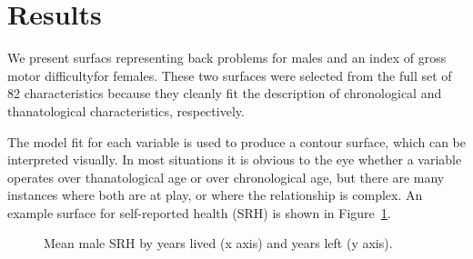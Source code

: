 \documentclass{article}
\begin{document}



\section*{Results}

We present surfacs representing back problems for males and
an index of gross motor difficultyfor females. These two surfaces were
selected from the full set of 82 characteristics because they cleanly fit the
description of chronological and thanatological characteristics, respectively.

The model fit for each variable is used to produce a contour surface, which can
be interpreted visually. In most situations it is obvious to the eye whether a
variable operates over thanatological age or over chronological age, but there
are many instances where both are at play, or where the relationship is
complex. An example surface for self-reported health (SRH) is shown in
Figure~\ref{fig:srh}.

\begin{figure}[!h]
    \centering
    \caption{Mean male SRH by years lived (x axis) and years left (y axis).}
    \label{fig:srh}
	\vspace{-2em}
\end{figure}
\end{document}
